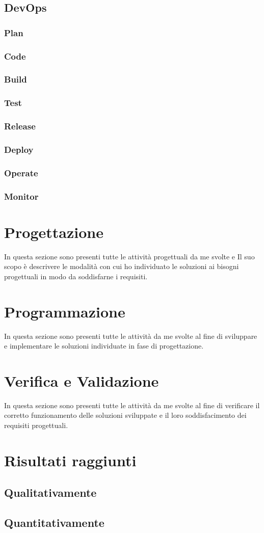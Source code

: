 \subsection{DevOps}
\subsubsection*{Plan}
\subsubsection*{Code}
\subsubsection*{Build}
\subsubsection*{Test}
\subsubsection*{Release}
\subsubsection*{Deploy}
\subsubsection*{Operate}
\subsubsection*{Monitor}

\section{Progettazione}
In questa sezione sono presenti tutte le attività progettuali da me svolte e Il suo scopo è descrivere le modalità con cui ho individuato le soluzioni ai bisogni progettuali in modo da soddisfarne i requisiti.

\section{Programmazione}
In questa sezione sono presenti tutte le attività da me svolte al fine di sviluppare e implementare le soluzioni individuate in fase di progettazione.

\section{Verifica e Validazione}
In questa sezione sono presenti tutte le attività da me svolte al fine di verificare il corretto funzionamento delle soluzioni sviluppate e il loro soddisfacimento dei requisiti progettuali.

\section{Risultati raggiunti}
\subsection{Qualitativamente}
%

\subsection{Quantitativamente}
%

